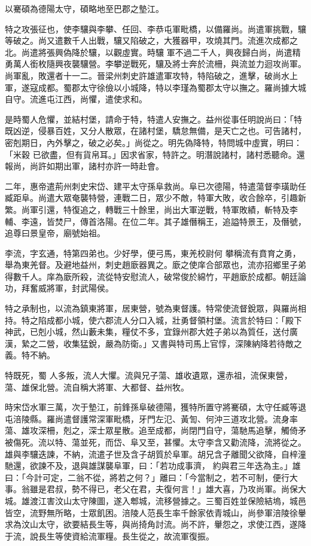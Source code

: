 \begin{pinyinscope}
 以騫碩為德陽太守，碩略地至巴郡之墊江。



 特之攻張征也，使李驤與李攀、任回、李恭屯軍毗橋，以備羅尚。尚遣軍挑戰，驤等破之。尚又遣數千人出戰，驤又陷破之，大獲器甲，攻燒其門。流進次成都之北。尚遣將張興偽降於驤，以觀虛實。時驤
 軍不過二千人，興夜歸白尚，尚遣精勇萬人銜枚隨興夜襲驤營。李攀逆戰死，驤及將士奔於流柵，與流並力迴攻尚軍。尚軍亂，敗還者十一二。晉梁州刺史許雄遣軍攻特，特陷破之，進擊，破尚水上軍，遂寇成都。蜀郡太守徐儉以小城降，特以李瑾為蜀郡太守以撫之。羅尚據大城自守。流進屯江西，尚懼，遣使求和。



 是時蜀人危懼，並結村堡，請命于特，特遣人安撫之。益州從事任明說尚曰：「特既凶逆，侵暴百姓，又分人散眾，在諸村堡，驕怠無備，是天亡之也。可告諸村，密剋期日，內外擊之，破之必矣。」尚從之。明先偽降特，特問城中虛實，明曰：「米穀
 已欲盡，但有貨帛耳。」因求省家，特許之。明潛說諸村，諸村悉聽命。還報尚，尚許如期出軍，諸村亦許一時赴會。



 二年，惠帝遣荊州刺史宋岱、建平太守孫阜救尚。阜已次德陽，特遣蕩督李璜助任臧距阜。尚遣大眾奄襲特營，連戰二日，眾少不敵，特軍大敗，收合餘卒，引趣新繁。尚軍引還，特復追之，轉戰三十餘里，尚出大軍逆戰，特軍敗績，斬特及李輔、李遠，皆焚尸，傳首洛陽。在位二年。其子雄僭稱王，追謚特景王，及僭號，追尊曰景皇帝，廟號始祖。



 李流，字玄通，特第四弟也。少好學，便弓馬，東羌校尉何
 攀稱流有賁育之勇，舉為東羌督。及避地益州，刺史趙廞器異之。廞之使庠合部眾也，流亦招鄉里子弟得數千人。庠為廞所殺，流從特安慰流人，破常俊於綿竹，平趙廞於成都。朝廷論功，拜奮威將軍，封武陽侯。



 特之承制也，以流為鎮東將軍，居東營，號為東督護。特常使流督銳眾，與羅尚相持。特之陷成都小城，使六郡流人分口入城，壯勇督領村堡。流言於特曰：「殿下神武，已剋小城，然山藪未集，糧仗不多，宜錄州郡大姓子弟以為質任，送付廣漢，縶之二營，收集猛銳，嚴為防衛。」又書與特司馬上官惇，深陳納降若待敵之義。特不納。



 特既死，蜀
 人多叛，流人大懼。流與兄子蕩、雄收遺眾，還赤祖，流保東營，蕩、雄保北營。流自稱大將軍、大都督、益州牧。



 時宋岱水軍三萬，次于墊江，前鋒孫阜破德陽，獲特所置守將騫碩，太守任臧等退屯涪陵縣。羅尚遣督護常深軍毗橋，牙門左氾、黃訇、何沖三道攻北營。流身率蕩、雄攻深柵，剋之，深士眾星散。追至成都，尚閉門自守，蕩馳馬追擊，觸倚矛被傷死。流以特、蕩並死，而岱、阜又至，甚懼。太守李含又勸流降，流將從之。雄與李驤迭諫，不納，流遣子世及含子胡質於阜軍。胡兄含子離聞父欲降，自梓潼馳還，欲諫不及，退與雄謀襲阜軍，曰：「若功成事濟，
 約與君三年迭為主。」雄曰：「今計可定，二翁不從，將若之何？」離曰：「今當制之，若不可制，便行大事。翁雖是君叔，勢不得已，老父在君，夫復何言！」雄大喜，乃攻尚軍。尚保大城。雄渡江害汶山太守陳圖，遂入郫城，流移營據之。三蜀百姓並保險結塢，城邑皆空，流野無所略，士眾飢困。涪陵人范長生率千餘家依青城山，尚參軍涪陵徐轝求為汶山太守，欲要結長生等，與尚掎角討流。尚不許，轝怨之，求使江西，遂降于流，說長生等使資給流軍糧。長生從之，故流軍復振。




\end{pinyinscope}
